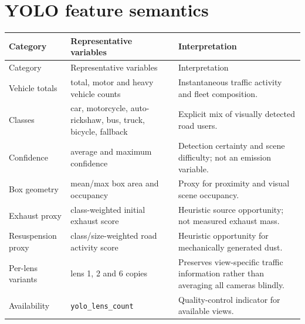 \documentclass[11pt,a4paper,oneside]{report}
\begin{document}
\section{YOLO feature semantics}
\begin{longtable}{p{}p{}p{}}
  \toprule
  Category & Representative variables & Interpretation\\
  \midrule
  \endfirsthead
  \toprule
  Category & Representative variables & Interpretation\\
  \midrule
  \endhead
  Vehicle totals & total, motor and heavy vehicle counts & Instantaneous traffic
  activity and fleet composition.\\
  Classes & car, motorcycle, auto-rickshaw, bus, truck, bicycle, fallback &
  Explicit mix of visually detected road users.\\
  Confidence & average and maximum confidence & Detection certainty and scene
  difficulty; not an emission variable.\\
  Box geometry & mean/max box area and occupancy & Proxy for proximity and visual
  scene occupancy.\\
  Exhaust proxy & class-weighted initial exhaust score & Heuristic source
  opportunity; not measured exhaust mass.\\
  Resuspension proxy & class/size-weighted road activity score & Heuristic
  opportunity for mechanically generated dust.\\
  Per-lens variants & lens 1, 2 and 6 copies & Preserves view-specific traffic
  information rather than averaging all cameras blindly.\\
  Availability & \texttt{yolo\_lens\_count} & Quality-control indicator for
  available views.\\
  \bottomrule
\end{longtable}
\end{document}
